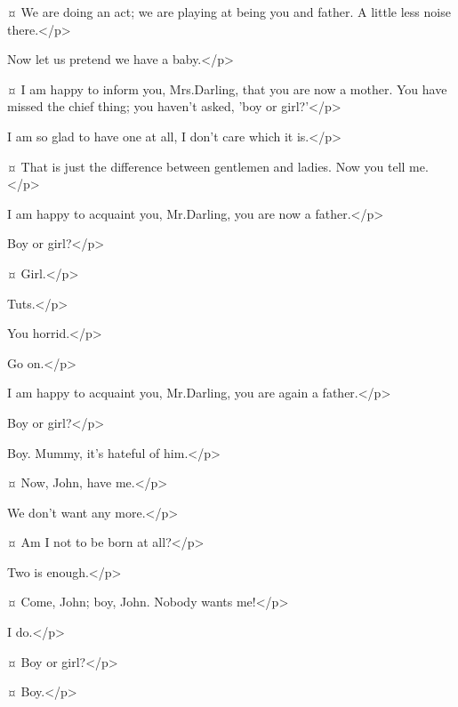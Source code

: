 \johnspeaks {}¤
We are doing an act; we are playing at being you and father.
A little less noise there.</p>

\wendyspeaks
Now let us pretend we have a baby.</p>

\johnspeaks {}¤
I am happy to inform you, Mrs.\@ Darling, that you are now a mother.
You have missed the chief thing; you haven't asked, 'boy or girl?'</p>

\wendyspeaks
I am so glad to have one at all, I don't care which it is.</p>

\johnspeaks {}¤
That is just the difference between gentlemen and ladies.
Now you tell me.</p>

\wendyspeaks
I am happy to acquaint you, Mr.\@ Darling, you are now a father.</p>

\johnspeaks
Boy or girl?</p>

\wendyspeaks {}¤
Girl.</p>

\johnspeaks
Tuts.</p>

\wendyspeaks
You horrid.</p>

\johnspeaks
Go on.</p>

\wendyspeaks
I am happy to acquaint you, Mr.\@ Darling, you are again a father.</p>

\johnspeaks
Boy or girl?</p>

\wendyspeaks
Boy.
Mummy, it's hateful of him.</p>


\michaelspeaks {}¤
Now, John, have me.</p>

\johnspeaks
We don't want any more.</p>

\michaelspeaks {}¤
Am I not to be born at all?</p>

\johnspeaks
Two is enough.</p>

\michaelspeaks {}¤
Come, John; boy, John.
Nobody wants me!</p>

\mrsdarlingspeaks
I do.</p>

\michaelspeaks {}¤
Boy or girl?</p>

\mrsdarlingspeaks {}¤
Boy.</p>

